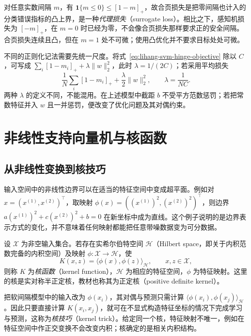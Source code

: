 对任意实数间隔 $m$，有 $\mathbf1\{m\le0\}\le[1-m]_+$，故合页损失是把零间隔也计入的分类错误指标的凸上界，是一种\emph{代理损失}（surrogate loss）。相比之下，感知机损失为 $[-m]_+$，在 $m=0$ 时已经为零，不会像合页损失那样要求正的安全间隔。合页损失连续且凸，但在 $m=1$ 处不可微；使用凸优化并不要求目标处处可微。

不同的正则化记法需要先统一尺度。将式~\eqref{eq:lihang-svm-hinge-objective} 除以 $C$，可写成 $\sum_i[1-m_i]_++\lambda\lVert w\rVert_2^2$，此时 $\lambda=1/(2C)$；若采用平均损失
\begin{equation}
  \frac1N\sum_i[1-m_i]_+
       +\frac{\lambda}{2}\lVert w\rVert_2^2,
  \qquad \lambda=\frac1{NC}.
  \label{eq:lihang-svm-average-risk}
\end{equation}
两种 $\lambda$ 的定义不同，不能混用。在上述模型中截距 $b$ 不受平方范数惩罚；若把常数特征并入 $w$ 且一并惩罚，便改变了优化问题及其对偶约束。

\section{非线性支持向量机与核函数}
\label{sec:lihang-svm-kernel}

\subsection{从非线性变换到核技巧}

输入空间中的非线性边界可以在适当的特征空间中变成超平面。例如对 $x=(x^{(1)},x^{(2)})^\top$，取映射 $\phi(x)=((x^{(1)})^2,(x^{(2)})^2)^\top$，则边界 $a(x^{(1)})^2+c(x^{(2)})^2+b=0$ 在新坐标中成为直线。这个例子说明的是边界表示方式的变化，并不意味着任何映射都能把任意带噪数据变为可分数据。

\begin{definition}[核函数]
设 $\mathcal X$ 为非空输入集合。若存在实希尔伯特空间 $\mathcal H$（Hilbert space，即关于内积范数完备的内积空间）及映射 $\phi:\mathcal X\to\mathcal H$，使
\begin{equation}
  K(x,z)=\langle\phi(x),\phi(z)\rangle_{\mathcal H},
  \qquad x,z\in\mathcal X,
  \label{eq:lihang-svm-kernel-definition}
\end{equation}
则称 $K$ 为\emph{核函数}（kernel function），$\mathcal H$ 为相应的特征空间，$\phi$ 为特征映射。这里的核是实对称半正定核，教材也称其为正定核（positive definite kernel）。
\end{definition}

把软间隔模型中的输入改为 $\phi(x_i)$，其对偶与预测只需计算 $\langle\phi(x_i),\phi(x_j)\rangle_{\mathcal H}$。因此只要直接计算 $K(x_i,x_j)$，就可在不显式构造特征坐标的情况下完成学习与预测，这称为\emph{核技巧}（kernel trick）。给定同一个核，特征映射不唯一，例如在特征空间中作正交变换不会改变内积；核确定的是相关内积结构。

